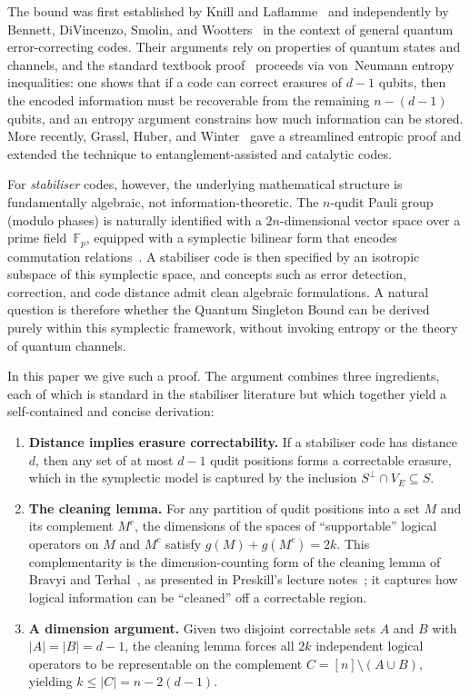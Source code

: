 \documentclass[11pt]{article}
\theoremstyle{plain}
\theoremstyle{definition}
\newcommand{\F}{\mathbb{F}}
\begin{document}
The bound was first established by Knill and Laflamme~\cite{KnillLaflamme1997} and
independently by Bennett, DiVincenzo, Smolin, and
Wootters~\cite{BennettDiVincenzoSmolinWootters1996} in the context of general quantum
error-correcting codes.  Their arguments rely on properties of quantum states and channels,
and the standard textbook proof~\cite{NielsenChuang} proceeds via von~Neumann entropy
inequalities: one shows that if a code can correct erasures of $d-1$ qubits, then the encoded
information must be recoverable from the remaining $n-(d-1)$ qubits, and an entropy argument
constrains how much information can be stored.  More recently, Grassl, Huber, and
Winter~\cite{GrasslHuberWinter2022} gave a streamlined entropic proof and extended the
technique to entanglement-assisted and catalytic codes.

For \emph{stabiliser} codes, however, the underlying mathematical structure is fundamentally
algebraic, not information-theoretic.  The $n$-qudit Pauli group (modulo phases) is naturally
identified with a $2n$-dimensional vector space over a prime field~$\F_p$, equipped with a
symplectic bilinear form that encodes commutation
relations~\cite{CalderbankRainsShorSloane1997,CalderbankRainsShorSloane1998,Gottesman1997}.
A stabiliser code is then specified by an isotropic subspace of this symplectic space, and
concepts such as error detection, correction, and code distance admit clean algebraic
formulations.  A natural question is therefore whether the Quantum Singleton Bound can be
derived purely within this symplectic framework, without invoking entropy or the theory of
quantum channels.

In this paper we give such a proof.  The argument combines three ingredients, each of which is
standard in the stabiliser literature but which together yield a self-contained and concise
derivation:
\begin{enumerate}[label=(\roman*)]
  \item \textbf{Distance implies erasure correctability.}  If a stabiliser code has distance
        $d$, then any set of at most $d-1$ qudit positions forms a correctable erasure, which
        in the symplectic model is captured by the inclusion $S^\perp \cap V_E \subseteq S$.
  \item \textbf{The cleaning lemma.}  For any partition of qudit positions into a set $M$ and
        its complement $M^c$, the dimensions of the spaces of ``supportable'' logical operators
        on $M$ and $M^c$ satisfy $g(M) + g(M^c) = 2k$.  This complementarity is the
        dimension-counting form of the cleaning lemma of Bravyi and
        Terhal~\cite{BravyiTerhal2009}, as presented in Preskill's lecture
        notes~\cite{Preskill2022TopologicalStabilizerCodes}; it captures how logical
        information can be ``cleaned'' off a correctable region.
  \item \textbf{A dimension argument.}  Given two disjoint correctable sets $A$ and $B$ with
        $|A|=|B|=d-1$, the cleaning lemma forces all $2k$ independent logical operators to be
        representable on the complement $C = [n] \setminus (A \cup B)$, yielding
        $k \le |C| = n - 2(d-1)$.
\end{enumerate}
\end{document}
